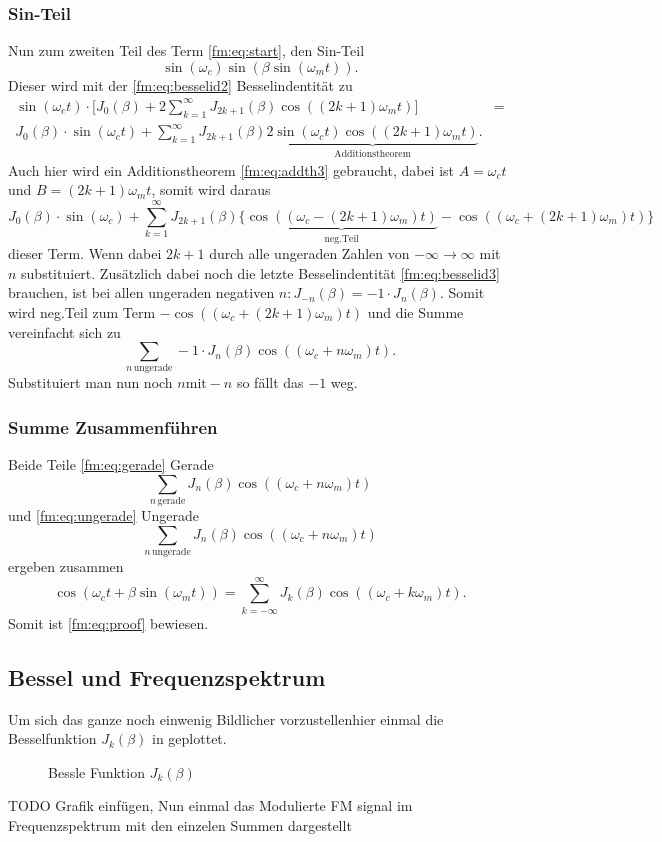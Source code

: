 \subsubsection{Sin-Teil}
Nun zum zweiten Teil des Term \eqref{fm:eq:start}, den Sin-Teil
\[
    \sin(\omega_c)\sin(\beta\sin(\omega_m t)).
\]
Dieser wird mit der \eqref{fm:eq:besselid2} Besselindentität zu
\begin{align*}
    \sin(\omega_c t) \cdot \bigg[ J_0(\beta) + 2 \sum_{k=1}^\infty J_{ 2k + 1}(\beta) \cos(( 2k + 1) \omega_m t) \bigg]
    &=\\
    J_0(\beta) \cdot \sin(\omega_c t) + \sum_{k=1}^\infty J_{2k+1}(\beta) \underbrace{2\sin(\omega_c t)\cos((2k+1)\omega_m t)}_{\text{Additionstheorem}}.
\end{align*}
Auch hier wird ein Additionstheorem \eqref{fm:eq:addth3} gebraucht, dabei ist \(A = \omega_c t\) und \(B = (2k+1)\omega_m t \), 
somit wird daraus
\[
    J_0(\beta) \cdot \sin(\omega_c) + \sum_{k=1}^\infty J_{2k+1}(\beta) \{ \underbrace{\cos((\omega_c-(2k+1)\omega_m) t)}_{\text{neg.Teil}} - \cos((\omega_c+(2k+1)\omega_m) t) \}
\]dieser Term.
Wenn dabei \(2k +1\) durch alle ungeraden Zahlen von \(-\infty \to \infty\) mit \(n\) substituiert.
Zusätzlich dabei noch die letzte Besselindentität \eqref{fm:eq:besselid3} brauchen, ist bei allen ungeraden negativen \(n : J_{-n}(\beta) = -1\cdot J_n(\beta)\).
Somit wird neg.Teil zum Term \(-\cos((\omega_c+(2k+1)\omega_m) t)\) und die Summe vereinfacht sich zu
\[
     \sum_{n\, \text{ungerade}} -1 \cdot J_{n}(\beta) \cos((\omega_c + n\omega_m) t).
     \label{fm:eq:ungerade}
\]
Substituiert man nun noch \(n \text{mit} -n \) so fällt das \(-1\) weg.

\subsubsection{Summe Zusammenführen}
Beide Teile \eqref{fm:eq:gerade} Gerade 
\[
    \sum_{n\, \text{gerade}} J_{n}(\beta) \cos((\omega_c + n\omega_m) t)
\]und \eqref{fm:eq:ungerade} Ungerade 
\[
    \sum_{n\, \text{ungerade}} J_{n}(\beta) \cos((\omega_c + n\omega_m) t)
\]
ergeben zusammen
\[
    \cos(\omega_ct+\beta\sin(\omega_mt))
    =
    \sum_{k= -\infty}^\infty J_{k}(\beta) \cos((\omega_c+k\omega_m)t).
\]
Somit ist \eqref{fm:eq:proof} bewiesen.
\newpage

\subsection{Bessel und Frequenzspektrum}
Um sich das ganze noch einwenig Bildlicher vorzustellenhier einmal die Besselfunktion \(J_{k}(\beta)\) in geplottet.
\begin{figure}
	\centering
%	
	\caption{Bessle Funktion \(J_{k}(\beta)\)}
	\label{fig:bessel}
\end{figure}
TODO Grafik einfügen,
\newline
Nun einmal das Modulierte FM signal im Frequenzspektrum mit den einzelen Summen dargestellt

